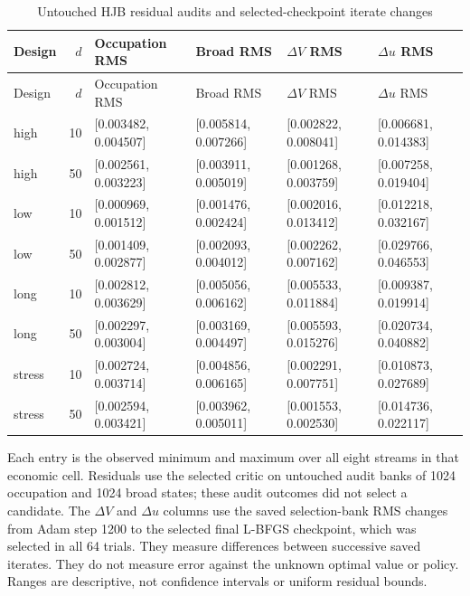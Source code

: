 \endgroup
\begingroup\footnotesize
\setlength{\tabcolsep}{3pt}
\begin{longtable}{lrllll}
\caption{Untouched HJB residual audits and selected-checkpoint iterate changes}\label{tab:r16hjbaudit}\\
\toprule
Design & $d$ & Occupation RMS & Broad RMS & $\Delta V$ RMS & $\Delta u$ RMS \\
\midrule
\endfirsthead
\toprule
Design & $d$ & Occupation RMS & Broad RMS & $\Delta V$ RMS & $\Delta u$ RMS \\
\midrule
\endhead
high & 10 & [0.003482, 0.004507] & [0.005814, 0.007266] & [0.002822, 0.008041] & [0.006681, 0.014383] \\
high & 50 & [0.002561, 0.003223] & [0.003911, 0.005019] & [0.001268, 0.003759] & [0.007258, 0.019404] \\
low & 10 & [0.000969, 0.001512] & [0.001476, 0.002424] & [0.002016, 0.013412] & [0.012218, 0.032167] \\
low & 50 & [0.001409, 0.002877] & [0.002093, 0.004012] & [0.002262, 0.007162] & [0.029766, 0.046553] \\
long & 10 & [0.002812, 0.003629] & [0.005056, 0.006162] & [0.005533, 0.011884] & [0.009387, 0.019914] \\
long & 50 & [0.002297, 0.003004] & [0.003169, 0.004497] & [0.005593, 0.015276] & [0.020734, 0.040882] \\
stress & 10 & [0.002724, 0.003714] & [0.004856, 0.006165] & [0.002291, 0.007751] & [0.010873, 0.027689] \\
stress & 50 & [0.002594, 0.003421] & [0.003962, 0.005011] & [0.001553, 0.002530] & [0.014736, 0.022117] \\
\bottomrule
\end{longtable}
\par\medskip\noindent\footnotesize Each entry is the observed minimum and maximum over all eight streams in that economic cell. Residuals use the selected critic on untouched audit banks of 1024 occupation and 1024 broad states; these audit outcomes did not select a candidate. The $\Delta V$ and $\Delta u$ columns use the saved selection-bank RMS changes from Adam step 1200 to the selected final L-BFGS checkpoint, which was selected in all 64 trials. They measure differences between successive saved iterates. They do not measure error against the unknown optimal value or policy. Ranges are descriptive, not confidence intervals or uniform residual bounds.
\endgroup
\begingroup\footnotesize
\setlength{\tabcolsep}{3pt}
